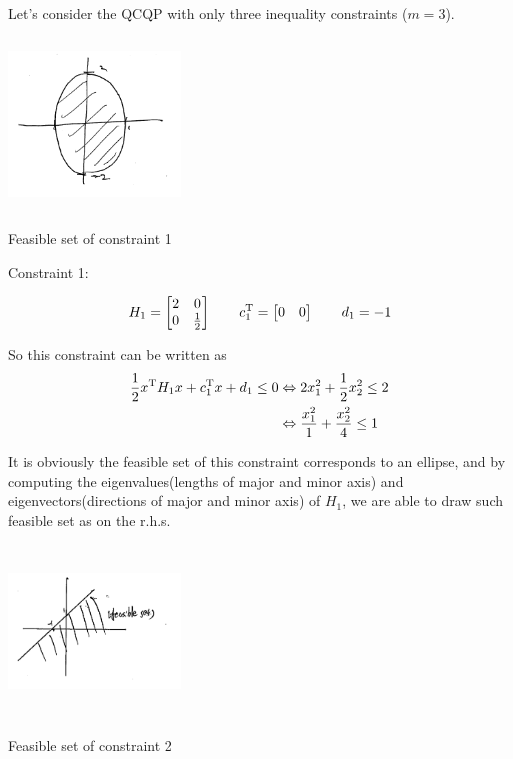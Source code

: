 \begin{example}
Let's consider the QCQP with only three inequality constraints ($m=3$).
\begin{marginfigure}
	\centering
	\includegraphics[width=1.8in,height=1.8in]{figures/ch07/figure1021_2.png}
	\caption{Feasible set of constraint 1} 
\end{marginfigure}

Constraint 1:

\begin{equation*}
H_1=\begin{bmatrix}
2 & 0 \\
0 &\frac{1}{2}
\end{bmatrix}
\qquad 
c_1^{{\rm T}} = \begin{bmatrix}
0 & 0
\end{bmatrix}
\qquad 
d_1 = -1
\end{equation*}

So this constraint can be written as
\begin{align*}
\frac{1}{2}x^{{\rm T}}H_1x + c_1^{{\rm T}}x + d_1 \leq 0 &\Leftrightarrow 2x_1^2 + \frac{1}{2}x_2^2 \leq 2\\
&\Leftrightarrow\frac{x_1^2}{1} + \frac{x_2^2}{4}\leq 1
\end{align*}

It is obviously the feasible set of this constraint corresponds to an ellipse, and by computing the eigenvalues(lengths of major and minor axis) and eigenvectors(directions of major and minor axis) of $H_1$, we are able to draw such feasible set as on the r.h.s.

\begin{marginfigure}
	\centering
	\includegraphics[width=1.8in,height=1.8in]{figures/ch07/figure1021_3.png}
	\caption{Feasible set of constraint 2} 
\end{marginfigure}


\end{example}
